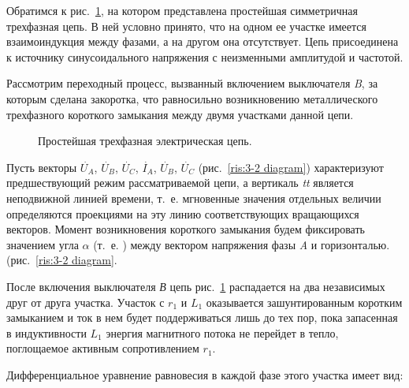 Обратимся к рис.~\ref{ris:3-1 simple_3_phase_circut}, на котором представлена простейшая симметричная трехфазная цепь. В ней условно принято, что на одном ее участке имеется взаимоиндукция между фазами, а на другом она отсутствует. Цепь присоединена к источнику синусоидального напряжения с неизменными амплитудой и частотой.

Рассмотрим переходный процесс, вызванный включением выключателя \textit{B}, за которым сделана закоротка, что равносильно возникновению металлического трехфазного короткого замыкания между двумя участками данной цепи.

\begin{figure}[h]
	\caption{Простейшая трехфазная электрическая цепь.}
	\label{ris:3-1 simple_3_phase_circut}
\end{figure}

Пусть векторы $ \overset{\;.}{U}_A $, $ \overset{\;.}{U}_B $, $ \overset{\;.}{U}_C $, $ \overset{\;.}{I}_A $, $ \overset{\;.}{U}_B $, $ \overset{\;.}{U}_C $ (рис.~\ref{ris:3-2 diagram})
характеризуют предшествующий режим рассматриваемой цепи, а вертикаль \textit{tt} является неподвижной линией времени, т.~е. мгновенные значения отдельных величии определяются проекциями на эту линию соответствующих вращающихся векторов. Момент возникновения короткого замыкания будем фиксировать значением угла $ \alpha $ (т.~е. ) между вектором напряжения фазы \textit{A} и горизонталью. (рис.~\ref{ris:3-2 diagram}.

После включения выключателя \textit{В} цепь рис.~\ref{ris:3-1 simple_3_phase_circut} распадается на два независимых друг от друга участка. Участок с $ r_1 $ и $ L_1 $ оказывается зашунтированным коротким замыканием и ток в нем будет поддерживаться лишь до тех пор, пока запасенная в индуктивности $ L_1 $ энергия магнитного потока не перейдет в тепло, поглощаемое активным сопротивлением $ r_1 $.

Дифференциальное уравнение равновесия в каждой фазе этого участка имеет вид:

